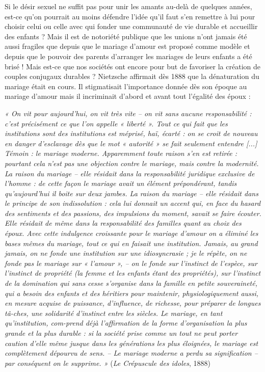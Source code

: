 Si le désir sexuel ne suffit pas pour unir les amants au-delà de quelques années, est-ce qu'on pourrait au moins défendre l'idée qu'il faut s'en remettre à lui pour choisir celui ou celle avec qui fonder une communauté de vie durable et accueillir des enfants ? Mais il est de notoriété publique que les unions n'ont jamais été aussi fragiles que depuis que le mariage d’amour est proposé comme modèle et depuis que le pouvoir des parents d’arranger les mariages de leurs enfants a été brisé ! 
Mais est-ce que nos sociétés ont encore pour but de favoriser la création de couples conjugaux durables ? Nietzsche affirmait dès 1888 que la dénaturation du mariage était en cours. Il stigmatisait l'importance donnée dès son époque au mariage d'amour mais il incriminait d’abord et avant tout l'égalité des époux :
\begin{displayquote}
\emph{« On vit pour aujourd'hui, on vit très vite -- on vit sans aucune responsabilité : c'est précisément ce que l'on appelle « liberté ». Tout ce qui fait que les institutions sont des institutions est méprisé, haï, écarté : on se croit de nouveau en danger d'esclavage dès que le mot « autorité » se fait seulement entendre [...] Témoin : le mariage moderne. Apparemment toute raison s'en est retirée : pourtant cela n'est pas une objection contre le mariage, mais contre la modernité. La raison du mariage -- elle résidait dans la responsabilité juridique exclusive de l'homme : de cette façon le mariage avait un élément prépondérant, tandis qu'aujourd'hui il boite sur deux jambes. La raison du mariage -- elle résidait dans le principe de son indissolution : cela lui donnait un accent qui, en face du hasard des sentiments et des passions, des impulsions du moment, savait se faire écouter. Elle résidait de même dans la responsabilité des familles quant au choix des époux. Avec cette indulgence croissante pour le mariage d'amour on a éliminé les bases mêmes du mariage, tout ce qui en faisait une institution. Jamais, au grand jamais, on ne fonde une institution sur une idiosyncrasie ; je le répète, on ne fonde pas le mariage sur « l'amour », -- on le fonde sur l'instinct de l'espèce, sur l'instinct de propriété (la femme et les enfants étant des propriétés), sur l'instinct de la domination qui sans cesse s'organise dans la famille en petite souveraineté, qui a besoin des enfants et des héritiers pour maintenir, physiologiquement aussi, en mesure acquise de puissance, d'influence, de richesse, pour préparer de longues tâ-ches, une solidarité d'instinct entre les siècles. Le mariage, en tant qu'institution, com-prend déjà l'affirmation de la forme d'organisation la plus grande et la plus durable : si la société prise comme un tout ne peut porter caution d'elle même jusque dans les générations les plus éloignées, le mariage est complètement dépourvu de sens. -- Le mariage moderne a perdu sa signification -- par conséquent on le supprime. »} (\emph{Le Crépuscule des idoles}, 1888) 
\end{displayquote}

